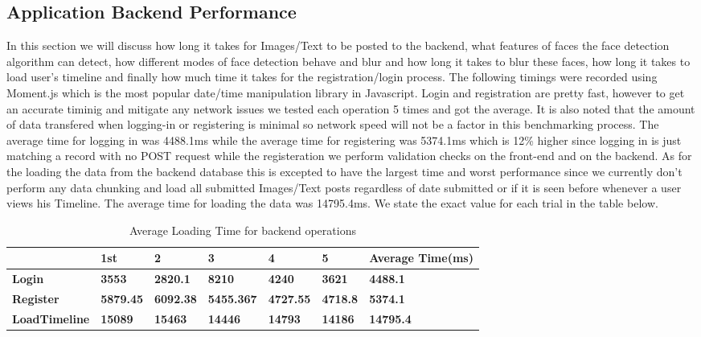 \subsection{Application Backend Performance}
In this section we will discuss how long it takes for Images/Text to be posted to the backend, what features of faces the face detection algorithm can detect, how different modes of face detection behave and blur and how long it takes to blur these faces,
how long it takes to load user's timeline and finally how much time it takes for the registration/login process.
\newline
\newline
\newline
\newline
The following timings were recorded using Moment.js which is the most popular date/time manipulation library in Javascript.
Login and registration are pretty fast, however to get an accurate timinig and mitigate any network issues we tested each operation 5 times and got the average. It is also noted that the amount of data transfered when logging-in or registering is minimal so network speed will not be a factor in this benchmarking process.
The average time for logging in was \num{4488.1}ms while the average time for registering was \num{5374.1}ms which is 12\% higher since logging in is just matching a record with no POST request while the registeration we perform validation checks on the front-end and on the backend.
As for the loading the data from the backend database this is excepted to have the largest time and worst performance since we currently don't perform any data chunking and load all submitted Images/Text posts regardless of date submitted or if it is seen before whenever a user views his Timeline.
The average time for loading the data was \num{14795.4}ms. We state the exact value for each trial in the table below.
\begin{table}[!h]
    \addtolength{\tabcolsep}{-4pt}
    \begin{tabular}{|l|l|l|l|l|l|l|}
    \hline
    \textbf{} & \textbf{1st} & \textbf{2} & \textbf{3} & \textbf{4} & \textbf{5} & \textbf{Average Time(ms)} \\ \hline
    \textbf{Login} & \textbf{3553} & \textbf{2820.1} & \textbf{8210} & \textbf{4240} & \textbf{3621} & \textbf{4488.1} \\ \hline
    \textbf{Register} & \textbf{5879.45} & \textbf{6092.38} & \textbf{5455.367} & \textbf{4727.55} & \textbf{4718.8} & \textbf{5374.1} \\ \hline
    \textbf{LoadTimeline} & \textbf{15089} & \textbf{15463} & \textbf{14446} & \textbf{14793} & \textbf{14186} & \textbf{14795.4} \\ \hline
    \end{tabular}
    \caption{Average Loading Time for backend operations}
    \label{tab:my-table}
\end{table}




